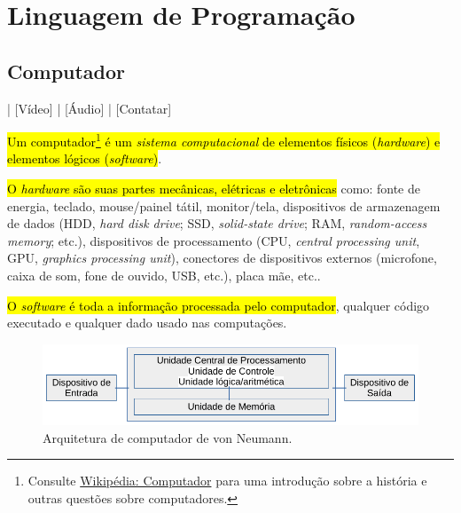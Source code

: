 
\chapter{Linguagem de Programação}\label{cap_lingua}
\thispagestyle{fancy}

\section{Computador}\label{cap_lim_sec_computador}

\begin{flushright}
  [YouTube] | [Vídeo] | [Áudio] | [Contatar]
\end{flushright}

\hl{Um computador\footnote{Consulte \href{https://pt.wikipedia.org/wiki/Computador}{Wikipédia: Computador} para uma introdução sobre a história e outras questões sobre computadores.} é um \emph{sistema computacional} de elementos físicos (\emph{hardware}) e elementos lógicos (\emph{software})}.

\hl{O \emph{hardware} são suas partes mecânicas, elétricas e eletrônicas} como: fonte de energia, teclado, mouse/painel tátil, monitor/tela, dispositivos de armazenagem de dados (HDD, {\it hard disk drive}; SSD, {\it solid-state drive}; RAM, {\it random-access memory}; etc.), dispositivos de processamento (CPU, {\it central processing unit}, GPU, {\it graphics processing unit}), conectores de dispositivos externos (microfone, caixa de som, fone de ouvido, USB, etc.), placa mãe, etc..

\hl{O \emph{software} é toda a informação processada pelo computador}, qualquer código executado e qualquer dado usado nas computações.

\begin{figure}[H]
  \centering
  \includegraphics[width=\textwidth]{./cap_lingua/dados/fig_arqVonNeumann/main}
  \caption[Arquitetura de von Neumann]{Arquitetura de computador de von Neumann.}
  \label{cap_lim_sec_computador:fig:arqVonNeumann}
\end{figure}

